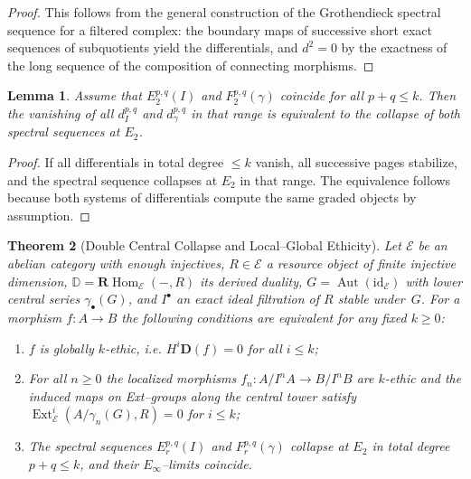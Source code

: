 \documentclass[12pt]{article}
\DeclareMathOperator{\Aut}{Aut}
\newcommand{\E}{\mathcal{E}}
\newcommand{\Ext}{\operatorname{Ext}}
\newcommand{\id}{\mathrm{id}}
\newcommand{\RHom}{\mathbf{R}\!\operatorname{Hom}}
\theoremstyle{plain}
\newtheorem{theorem}{Theorem}[section]
\newtheorem{lemma}[theorem]{Lemma}
\theoremstyle{definition}
\theoremstyle{remark}
\numberwithin{equation}{section}
\begin{document}
\begin{proof}
This follows from the general construction of the Grothendieck spectral sequence for a filtered complex: the boundary maps of successive short exact sequences of subquotients yield the differentials, and \(d^2=0\) by the exactness of the long sequence of the composition of connecting morphisms.  
\end{proof}

\begin{lemma}
Assume that \(E^{p,q}_2(I)\) and \(F^{p,q}_2(\gamma)\) coincide for all \(p+q\le k\). Then the vanishing of all \(d_I^{p,q}\) and \(d_\gamma^{p,q}\) in that range is equivalent to the collapse of both spectral sequences at \(E_2\).
\end{lemma}

\begin{proof}
If all differentials in total degree \(\le k\) vanish, all successive pages stabilize, and the spectral sequence collapses at \(E_2\) in that range. The equivalence follows because both systems of differentials compute the same graded objects by assumption.  
\end{proof}

\begin{theorem}[Double Central Collapse and Local–Global Ethicity]
Let \(\E\) be an abelian category with enough injectives, \(R\in\E\) a resource object of finite injective dimension, \(\mathbb D=\RHom_\E(-,R)\) its derived duality, \(G=\Aut(\id_\E)\) with lower central series \(\gamma_\bullet(G)\), and \(I^\bullet\) an exact ideal filtration of \(R\) stable under~\(G\).
For a morphism \(f:A\to B\) the following conditions are equivalent for any fixed \(k\ge0\):
\begin{enumerate}[label=(\roman*)]
\item \(f\) is globally \(k\)-ethic, i.e. \(H^i\mathbf D(f)=0\) for all \(i\le k\);
\item For all \(n\ge0\) the localized morphisms \(f_n:A/I^nA\to B/I^nB\) are \(k\)-ethic and the induced maps on Ext–groups along the central tower satisfy
\(\Ext^i_\E(A/\gamma_n(G),R)=0\) for \(i\le k\);
\item The spectral sequences \(E^{p,q}_r(I)\) and \(F^{p,q}_r(\gamma)\)
collapse at \(E_2\) in total degree \(p+q\le k\), and their \(E_\infty\)–limits coincide.
\end{enumerate}
\end{theorem}
\end{document}
